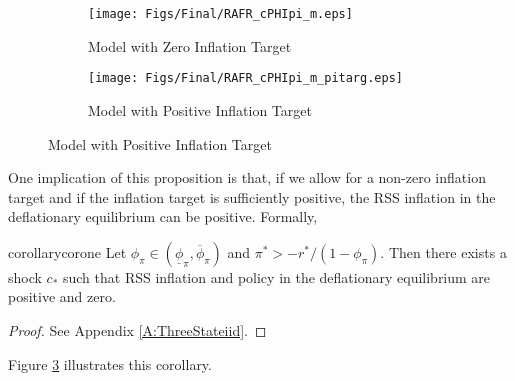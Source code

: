 \documentclass[11pt]{article}
\begin{document}
	\begin{figure}[t]
		\caption{Risky Steady States: $\phi_{\pi}\in(\underline{\phi}_{\pi},\overline{\phi}_{\pi})$}
		\begin{center}
			\begin{subfigure}[b]{0.499\textwidth}
				\centering
				\texttt{[image: Figs/Final/RAFR\_cPHIpi\_m.eps]}
				\caption{Model with Zero Inflation Target}
				\label{fig:RAFR_Baseline}
			\end{subfigure}
			\begin{subfigure}[b]{0.49\textwidth}
				\centering
				\texttt{[image: Figs/Final/RAFR\_cPHIpi\_m\_pitarg.eps]}
				\caption{Model with Positive Inflation Target}
				\label{fig:RAFR_Baseline_inftarg}
			\end{subfigure}
		\end{center}
	\end{figure}
		
	One implication of this proposition is that, if we allow for a non-zero inflation target and if the inflation target is sufficiently positive, the RSS inflation in the deflationary equilibrium can be positive. Formally,
	
	\begin{restatable}{corollary}{corone}
		Let $\phi_{\pi}\in(\underline{\phi}_{\pi},\overline{\phi}_{\pi})$ and $\pi^* > -r^*/(1-\phi_{\pi})$. Then there exists a shock $c_*$ such that RSS inflation and policy in the deflationary equilibrium are positive and zero.
	\end{restatable}
	\begin{proof}
		See Appendix \ref{A:ThreeStateiid}.
	\end{proof}
	
	Figure \ref{fig:RAFR_Baseline_inftarg} illustrates this corollary.	
	
	
\end{document}

